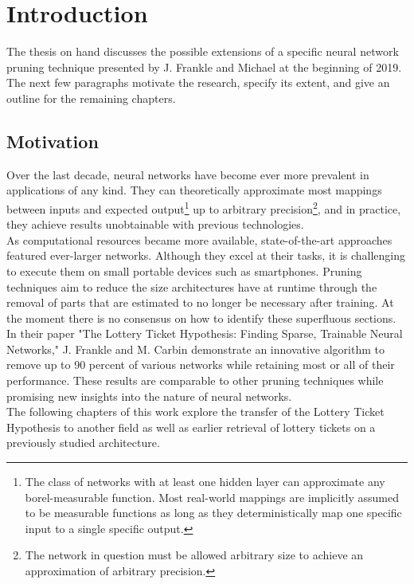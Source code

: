 \chapter{Introduction}
The thesis on hand discusses the possible extensions of a specific neural network pruning technique presented by J. Frankle and Michael at the beginning of 2019.\cite{LTH}\\
The next few paragraphs motivate the research,  specify its extent, and give an outline for the remaining chapters.

\section{Motivation}
Over the last decade, neural networks have become ever more prevalent in applications of any kind. They can theoretically approximate most mappings between inputs and expected output\footnote{The class of networks with at least one hidden layer can approximate any borel-measurable function. Most real-world mappings are implicitly assumed to be measurable functions as long as they deterministically map one specific input to a single specific output.
} up to arbitrary precision\footnote{The network in question must be allowed arbitrary size to achieve an approximation of arbitrary precision.
}\cite{Approximator}, and in practice, they achieve results unobtainable with previous technologies.\\ 
As computational resources became more available, state-of-the-art approaches featured ever-larger networks. Although they excel at their tasks, it is challenging to execute them on small portable devices such as smartphones. Pruning techniques aim to reduce the size architectures have at runtime through the removal of parts that are estimated to no longer be necessary after training. At the moment there is no consensus on how to identify these superfluous sections.\\
In their paper "The Lottery Ticket Hypothesis: Finding Sparse, Trainable Neural Networks," J. Frankle and M. Carbin demonstrate an innovative algorithm to remove up to 90 percent of various networks while retaining most or all of their performance. These results are comparable to other pruning techniques while promising new insights into the nature of neural networks.\cite{LTH}
\\
The following chapters of this work explore the transfer of the Lottery Ticket Hypothesis to another field as well as earlier retrieval of lottery tickets on a previously studied architecture.

